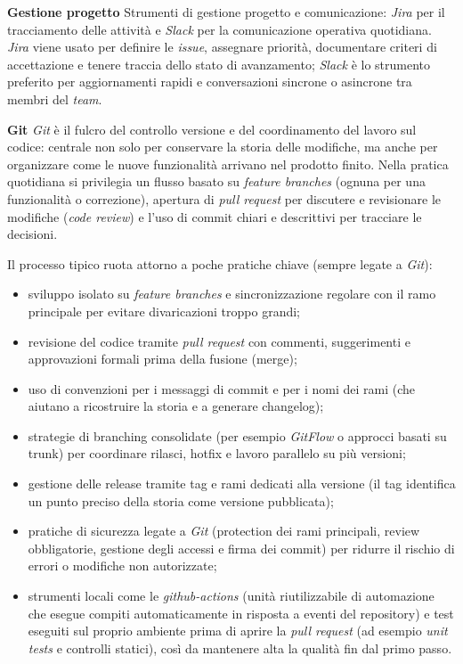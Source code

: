\medskip
\noindent\textbf{Gestione progetto}
Strumenti di gestione progetto e comunicazione: \emph{Jira} per il tracciamento delle attività e \emph{Slack} per la comunicazione operativa quotidiana. \emph{Jira} 
viene usato per definire le \emph{issue}, assegnare priorità, documentare criteri di accettazione e tenere traccia dello stato di avanzamento; \emph{Slack} 
è lo strumento preferito per aggiornamenti rapidi e conversazioni sincrone o asincrone tra membri del \emph{team}.

\medskip
\noindent\textbf{Git}
\emph{Git} è il fulcro del controllo versione e del coordinamento del lavoro sul codice: 
centrale non solo per conservare la storia delle modifiche, ma anche per organizzare come le nuove funzionalità arrivano nel prodotto finito. 
Nella pratica quotidiana si privilegia un flusso basato su \emph{feature branches} (ognuna per una funzionalità o correzione), 
apertura di \emph{pull request} per discutere e revisionare le modifiche (\emph{code review}) e l’uso di commit chiari e descrittivi per tracciare le decisioni.

Il processo tipico ruota attorno a poche pratiche chiave (sempre legate a \emph{Git}):
\begin{itemize}
\item sviluppo isolato su \emph{feature branches} e sincronizzazione regolare con il ramo principale per evitare divaricazioni troppo grandi;
\item revisione del codice tramite \emph{pull request} con commenti, suggerimenti e approvazioni formali prima della fusione (merge);
\item uso di convenzioni per i messaggi di commit e per i nomi dei rami (che aiutano a ricostruire la storia e a generare changelog);
\item strategie di branching consolidate (per esempio \emph{GitFlow} o approcci basati su trunk) per coordinare rilasci, hotfix e lavoro parallelo su più versioni;
\item gestione delle release tramite tag e rami dedicati alla versione (il tag identifica un punto preciso della storia come versione pubblicata);
\item pratiche di sicurezza legate a \emph{Git} (protection dei rami principali, review obbligatorie, gestione degli accessi e firma dei commit) per ridurre il rischio di errori o modifiche non autorizzate;
\item strumenti locali come le \emph{github-actions} (unità riutilizzabile di automazione che esegue compiti automaticamente in risposta a eventi del repository) e test eseguiti sul proprio ambiente prima di aprire la \emph{pull request} (ad esempio \emph{unit tests} e controlli statici), così da mantenere alta la qualità fin dal primo passo.
\end{itemize}

